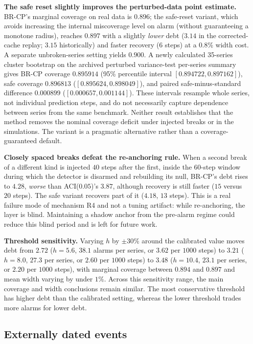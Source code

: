 \documentclass[10pt]{article}
\newcommand{\brcp}{\textsc{BR-CP}}
\begin{document}
\textbf{The safe reset slightly improves the perturbed-data point estimate.} \brcp{}'s marginal
coverage on real data is $0.896$; the safe-reset variant, which avoids increasing the internal miscoverage level on alarm (without guaranteeing a monotone radius), reaches $0.897$ with a slightly \emph{lower}
debt ($3.14$ in the corrected-cache replay; $3.15$ historically) and faster recovery ($6$ steps) at a $0.8\%$ width cost. A separate unbroken-series setting yields $0.900$. A newly calculated
35-series cluster bootstrap on the archived perturbed variance-test per-series
summary gives BR-CP coverage $0.895914$ (95\% percentile interval
$[0.894722,0.897162]$), safe coverage $0.896813$
($[0.895624,0.898049]$), and paired safe-minus-standard difference
$0.000899$ ($[0.000657,0.001144]$). These intervals resample whole series,
not individual prediction steps, and do not necessarily capture dependence
between series from the same benchmark. Neither result establishes that the method removes the nominal coverage deficit under injected breaks or in the simulations. The variant is a pragmatic alternative rather than a coverage-guaranteed default.

\textbf{Closely spaced breaks defeat the re-anchoring rule.} When a second
break of a different kind is injected $40$ steps after the first, inside the
$60$-step window during which the detector is disarmed and rebuilding its null,
\brcp{}'s debt rises to $4.28$, \emph{worse} than ACI($0.05$)'s $3.87$,
although recovery is still faster ($15$ versus $20$ steps). The safe variant
recovers part of it ($4.18$, $13$ steps). This is a real failure mode of
mechanism R4 and not a tuning artifact: while re-anchoring, the layer is blind.
Maintaining a shadow anchor from the pre-alarm regime could reduce this blind period and is left for future work.

\textbf{Threshold sensitivity.} Varying $h$ by $\pm30\%$ around the calibrated
value moves debt from $2.72$ ($h=5.6$, $38.1$ alarms per series, or $3.62$ per $1000$ steps) to $3.21$ ($h=8.0$, $27.3$ per series, or $2.60$ per $1000$ steps) to $3.48$ ($h=10.4$, $23.1$ per series, or $2.20$ per $1000$ steps), with marginal coverage
between $0.894$ and $0.897$ and mean width varying by under $1\%$. Across this sensitivity range, the main coverage and width conclusions remain similar. The most conservative threshold has higher debt than the calibrated setting, whereas the lower threshold trades more alarms for lower debt.



\subsection{Externally dated events}
\label{sec:cases}
\end{document}
